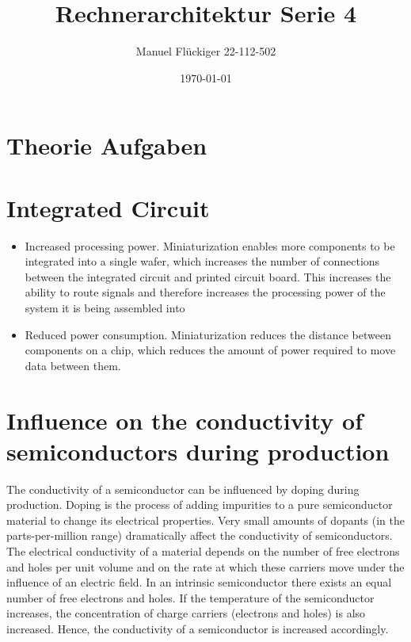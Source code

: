 \documentclass{article}
\author{Manuel Flückiger 22-112-502}
\title{Rechnerarchitektur Serie 4}
\date{\today}
\begin{document}
\newcommand{\mycomment}[1]{}

\maketitle

\section*{Theorie Aufgaben}
\section{Integrated Circuit}
\begin{itemize}
    \item Increased processing power. \newline
    Miniaturization enables more components to be integrated into a 
    single wafer, which increases the number of connections between 
    the integrated circuit and printed circuit board. This increases 
    the ability to route signals and therefore increases the processing 
    power of the system it is being assembled into

    \item Reduced power consumption. \newline
    Miniaturization reduces the distance between components on a chip, 
    which reduces the amount of power required to move data between them.
\end{itemize}

\section{Influence on the conductivity of semiconductors during production}

The conductivity of a semiconductor can be influenced by doping during production. 
Doping is the process of adding impurities to a pure semiconductor material to change
its electrical properties. Very small amounts of dopants (in the parts-per-million range)
dramatically affect the conductivity of semiconductors. The electrical conductivity
of a material depends on the number of free electrons and holes per unit volume and 
on the rate at which these carriers move under the influence of
an electric field. In an intrinsic semiconductor there exists an equal number of 
free electrons and holes. If the temperature of the semiconductor increases, the 
concentration of charge carriers (electrons and holes) is also increased. Hence, 
the conductivity of a semiconductor is increased accordingly. 
\end{document}
